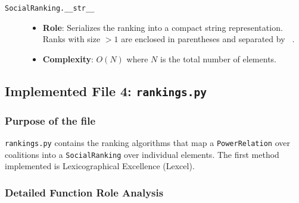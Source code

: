 \documentclass[11pt]{article}
\newcommand{\pathitem}[1]{\texttt{#1}}
\begin{document}
\begin{description}
  \item[\pathitem{SocialRanking.\_\_str\_\_}]
  \begin{itemize}
    \item \textbf{Role}: Serializes the ranking into a compact string representation. Ranks with size $>1$ are enclosed in parentheses and separated by \texttt{\string~}.
    \item \textbf{Complexity}: $O(N)$ where $N$ is the total number of elements.
  \end{itemize}
\end{description}

\subsection{Implemented File 4: \pathitem{rankings.py}}

\subsubsection*{Purpose of the file}

\pathitem{rankings.py} contains the ranking algorithms that map a \pathitem{PowerRelation} over coalitions into a \pathitem{SocialRanking} over individual elements. The first method implemented is Lexicographical Excellence (Lexcel).

\subsubsection*{Detailed Function Role Analysis}
\end{document}
